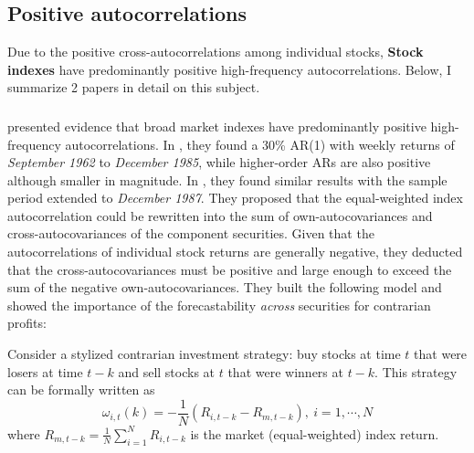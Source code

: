 \subsubsection{\citet{de1985does}}\label{chap1:sec2:ssec1:paper3}

\subsubsection{\citet{pastor2012stocks}}\label{chap1:sec2:ssec1:paper4}

\subsection{Positive autocorrelations}\label{chap1:sec2:ssec2}
Due to the positive cross-autocorrelations among individual stocks, \textbf{Stock indexes} have predominantly
positive high-frequency autocorrelations. Below, I summarize 2 papers in detail on this subject.

\subsubsection{\citet{lo1988stock,lo1990contrarian}}\label{chap1:sec2:ssec2:paper1}
\citet{lo1988stock,lo1990contrarian} presented evidence that broad market indexes have predominantly positive
high-frequency autocorrelations. In \citeyear{lo1988stock}, they found a 30\% AR(1) with weekly returns
of \textit{September 1962} to \textit{December 1985}, while higher-order ARs are also positive although smaller in magnitude.
In \citeyear{lo1990contrarian}, they found similar results with the sample period extended to \textit{December 1987}.
They proposed that the equal-weighted index autocorrelation could be rewritten into the sum of own-autocovariances
and cross-autocovariances of the component securities. Given that the autocorrelations of individual stock returns
are generally negative, they deducted that the cross-autocovariances must be positive and large enough to exceed the sum
of the negative own-autocovariances. They built the following model and showed the importance of the forecastability 
\textit{across} securities for contrarian profits:

Consider a stylized contrarian investment strategy: buy stocks at time $t$ that were losers at time $t-k$ and sell 
stocks at $t$ that were winners at $t-k$. This strategy can be formally written as 
$$
\omega_{i,t}(k)=-\frac{1}{N}(R_{i,t-k}-R_{m,t-k}),\ i=1,\cdots,N
$$
where $R_{m,t-k}=\frac{1}{N}\sum^N_{i=1}R_{i,t-k}$ is the market (equal-weighted) index return.

